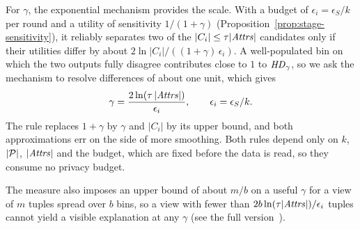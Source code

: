 For $\gamma$, the exponential mechanism provides the scale.
With a budget of $\epsilon_i=\epsilon_S/k$ per round and a utility of sensitivity $1/(1+\gamma)$ (Proposition~\ref{prop:stage-sensitivity}), it reliably separates two of the $|C_i|\le\tau|\mathit{Attrs}|$ candidates only if their utilities differ by about $2\ln|C_i|/((1+\gamma)\,\epsilon_i)$.
A well-populated bin on which the two outputs fully disagree contributes close to $1$ to $\mathit{HD}_\gamma$, so we ask the mechanism to resolve differences of about one unit, which gives
\begin{equation}
\gamma=\frac{2\ln(\tau\,|\mathit{Attrs}|)}{\epsilon_i},\qquad \epsilon_i=\epsilon_S/k .
\label{eq:gamma-rule}
\end{equation}
The rule replaces $1+\gamma$ by $\gamma$ and $|C_i|$ by its upper bound, and both approximations err on the side of more smoothing.
Both rules depend only on $k$, $|\mathcal{P}|$, $|\mathit{Attrs}|$ and the budget, which are fixed before the data is read, so they consume no privacy budget.

The measure also imposes an upper bound of about $m/b$ on a useful $\gamma$ for a view of $m$ tuples spread over $b$ bins, so a view with fewer than $2b\ln(\tau|\mathit{Attrs}|)/\epsilon_i$ tuples cannot yield a visible explanation at any $\gamma$ (see \ifpaper the full version~\cite{fullversion}\else {}\fi).


